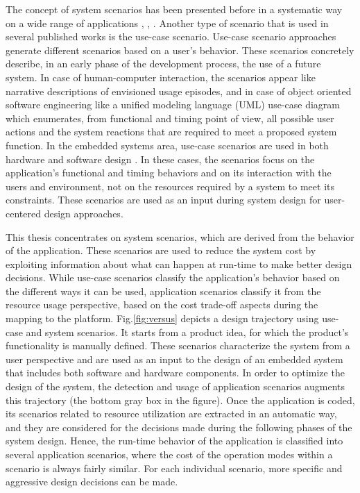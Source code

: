The concept of system scenarios has been presented before in a systematic way on a wide range of applications \cite{GheoThesis}, \cite{tcm}, \cite{Gheorghita2007}.
Another type of scenario that is used in several published works is the use-case scenario.
Use-case scenario approaches generate different scenarios based on a user's behavior.
These scenarios concretely describe, in an early phase of the development process, the use of a future system. 
In case of human-computer interaction, the scenarios appear like narrative descriptions of envisioned usage episodes, and in case of object oriented software engineering like a unified modeling language (UML)  use-case diagram which enumerates, from functional and timing point of view, all possible user actions and the system reactions that are required to meet a proposed system function. 
In the embedded systems area, use-case scenarios are used in both hardware \cite{52} \cite{85} and software design \cite{29}. 
In these cases, the scenarios focus on the application’s functional and timing behaviors and on its interaction with the users and environment, not on the resources required by a system to meet its constraints. 
These scenarios are used as an input during system design for user-centered design approaches.	

This thesis concentrates on system scenarios, which are derived from the behavior of the application. 
These scenarios are used to reduce the system cost by exploiting information about what can happen at run-time to make better design decisions. 
While use-case scenarios classify the application's behavior based on the different ways it can be used, application scenarios classify it from the resource usage perspective, based on the cost trade-off aspects during the mapping to the platform. 
Fig.\ref{fig:versus} depicts a design trajectory using use-case and system scenarios. 
It starts from a product idea, for which the product's functionality is manually defined. 
These scenarios characterize the system from a user perspective and are used as an input to the design of an embedded system that includes both software and hardware components. 
In order to optimize the design of the system, the detection and usage of application scenarios augments this trajectory (the bottom gray box in the figure). 
Once the application is coded, its scenarios related to resource utilization are extracted in an automatic way, and they are considered for the decisions made during the following phases of the system design. 
Hence, the run-time behavior of the application is classified into several application scenarios, where the cost of the operation modes within a scenario is always fairly similar. 
For each individual scenario, more specific and aggressive design decisions can be made.

